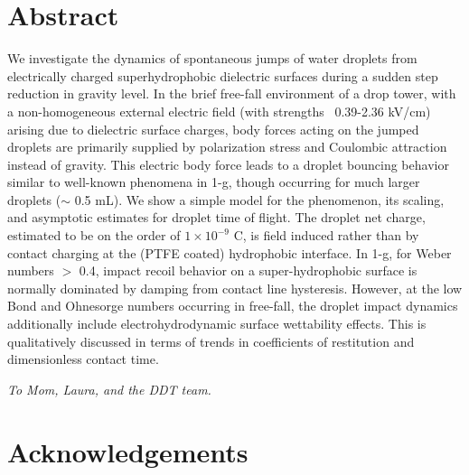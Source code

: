 \documentclass[12pt,a4paper,oneside]{book}
\begin{document}
\section*{Abstract}
\noindent
We investigate the dynamics of spontaneous jumps of water droplets from electrically charged superhydrophobic dielectric surfaces during a sudden step reduction in gravity level. In the brief free-fall environment of a drop tower, with a non-homogeneous external electric field (with strengths ~0.39-2.36 kV/cm) arising due to dielectric surface charges, body forces acting on the jumped droplets are primarily supplied by polarization stress and Coulombic attraction instead of gravity. This electric body force leads to a droplet bouncing behavior similar to well-known phenomena in 1-g, though occurring for much larger droplets ($\sim$ 0.5 mL). We show a simple model for the phenomenon, its scaling, and asymptotic estimates for droplet time of flight. The droplet net charge, estimated to be on the order of $1 \times 10^{-9}$ C, is field induced rather than by contact charging at the (PTFE coated) hydrophobic interface. In 1-g, for Weber numbers $>$ 0.4, impact recoil behavior on a super-hydrophobic surface is normally dominated by damping from contact line hysteresis. However, at the low Bond and Ohnesorge numbers occurring in free-fall, the droplet impact dynamics additionally include electrohydrodynamic surface wettability effects. This is qualitatively discussed in terms of trends in coefficients of restitution and dimensionless contact time.

\clearpage

\vspace*{\fill}

\emph{To Mom, Laura, and the DDT team.}\\
\vspace*{\fill}

\clearpage


\vspace*{\fill}
\section*{Acknowledgements}
\end{document}
